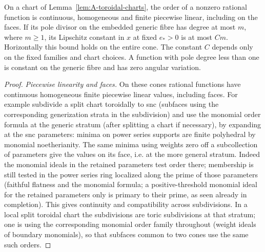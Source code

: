 \begin{lemma}\label{lem:A-function-slopes}
On a chart of Lemma~\ref{lem:A-toroidal-charts}, the order of a nonzero rational
function is continuous, homogeneous and finite piecewise linear,
including on the faces.  If its pole divisor on the embedded generic
fibre has degree at most \(m\), where \(m\ge1\), its Lipschitz constant
in \(x\) at fixed \(e_*>0\) is at most \(Cm\).  Horizontally this bound
holds on the entire cone.  The constant \(C\) depends only on the fixed
families and chart choices.  A function with pole degree less than one
is constant on the generic fibre and has zero angular variation.
\end{lemma}

\begin{proof}
\emph{Piecewise linearity and faces.}
On these cones rational functions have continuous homogeneous finite piecewise linear values, including faces.
For example subdivide a split chart toroidally to snc (subfaces using the corresponding generization strata in the subdivision) and use the monomial order formula at the generic stratum (after splitting a chart if necessary), by expanding at the snc parameters: minima on power series supports are finite polyhedral by monomial noetherianity.
The same minima using weights zero off a subcollection of parameters give the values on its face, i.e. at the more general stratum.
Indeed the monomial ideals in the retained parameters test order there; membership is still tested in the power series ring localized along the prime of those parameters (faithful flatness and the monomial formula; a positive-threshold monomial ideal for the retained parameters only is primary to their prime, as seen already in completion).
This gives continuity and compatibility across subdivisions.
In a local split toroidal chart the subdivisions are toric subdivisions at that stratum; one is using the corresponding monomial order family throughout (weight ideals of boundary monomials), so that subfaces common to two cones use the same such orders.


\end{proof}
